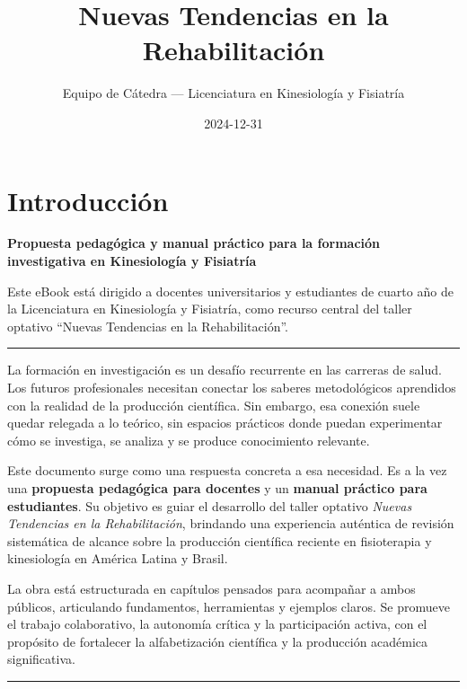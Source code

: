 \documentclass[
  letterpaper,
]{book}
\title{Nuevas Tendencias en la Rehabilitación}
\author{Equipo de Cátedra --- Licenciatura en Kinesiología y Fisiatría}
\date{2024-12-31}
\renewcommand*\contentsname{Tabla de contenidos}
\newcommand\contentsname{Tabla de contenidos}
\begin{document}
\frontmatter
\maketitle

\renewcommand*\contentsname{Tabla de contenidos}
{
\setcounter{tocdepth}{2}
\tableofcontents
}

\mainmatter
{}

\chapter{Introducción}\label{introducciuxf3n}

\textbf{Propuesta pedagógica y manual práctico para la formación
investigativa en Kinesiología y Fisiatría}

Este eBook está dirigido a docentes universitarios y estudiantes de
cuarto año de la Licenciatura en Kinesiología y Fisiatría, como recurso
central del taller optativo ``Nuevas Tendencias en la Rehabilitación''.

\begin{center}\rule{0.5\linewidth}{0.5pt}\end{center}

La formación en investigación es un desafío recurrente en las carreras
de salud. Los futuros profesionales necesitan conectar los saberes
metodológicos aprendidos con la realidad de la producción científica.
Sin embargo, esa conexión suele quedar relegada a lo teórico, sin
espacios prácticos donde puedan experimentar cómo se investiga, se
analiza y se produce conocimiento relevante.

Este documento surge como una respuesta concreta a esa necesidad. Es a
la vez una \textbf{propuesta pedagógica para docentes} y un
\textbf{manual práctico para estudiantes}. Su objetivo es guiar el
desarrollo del taller optativo \emph{Nuevas Tendencias en la
Rehabilitación}, brindando una experiencia auténtica de revisión
sistemática de alcance sobre la producción científica reciente en
fisioterapia y kinesiología en América Latina y Brasil.

La obra está estructurada en capítulos pensados para acompañar a ambos
públicos, articulando fundamentos, herramientas y ejemplos claros. Se
promueve el trabajo colaborativo, la autonomía crítica y la
participación activa, con el propósito de fortalecer la alfabetización
científica y la producción académica significativa.

\begin{center}\rule{0.5\linewidth}{0.5pt}\end{center}
\end{document}
